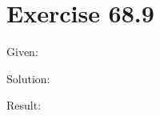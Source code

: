\documentclass[a4paper, 10pt]{scrartcl}
\begin{document}
\section{Exercise 68.9}

Given:

Solution:

Result:
\end{document}
